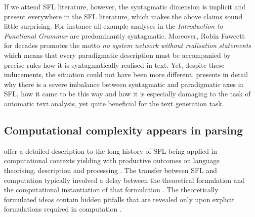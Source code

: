 
If we attend SFL literature, however, the syntagmatic dimension is implicit and present everywhere in the SFL literature, which makes the above claims sound little surprising. For instance all example analyses in the \textit{Introduction to Functional Grammar} \citep{Halliday2013} are predominantly syntagmatic. 
Moreover, Robin Fawcett for decades promotes the motto \textit{no system network without realisation statements} \citep[9]{Fawcett88-good} which means that every paradigmatic description must be accompanied by precise rules how it is syntagmatically realised in text. Yet, despite these inducements, the situation could not have been more different. \citet{Bateman2008} presents in detail why there is a severe imbalance between syntagmatic and paradigmatic axes in SFL, how it came to be this way and how it is especially damaging to the task of automatic text analysis, yet quite beneficial for the text generation task. 

\subsection{Computational complexity appears in parsing}

\citet{ODonnell2005} offer a detailed description to the long history of SFL being applied in computational contexts yielding with productive outcomes on language theorising, description and processing \citep[139]{BatemanMatthiessen88}. The transfer between SFL and computation typically involved a delay between the theoretical formulation and the computational instantiation of that formulation \citep[19]{MatthiessenBateman91}. The theoretically formulated ideas contain hidden pitfalls that are revealed only upon explicit formulations required in computation \mbox{\citep[27]{Bateman2008}}. 

